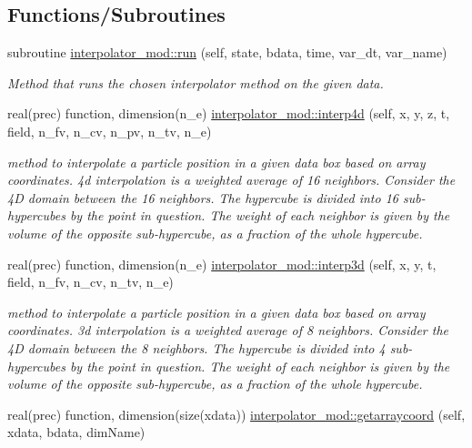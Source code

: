 \subsection*{Functions/\+Subroutines}
\begin{DoxyCompactItemize}
\item 
subroutine \mbox{\hyperlink{namespaceinterpolator__mod_a53b61f6bca0d966521c68cb3ca838d93}{interpolator\+\_\+mod\+::run}} (self, state, bdata, time, var\+\_\+dt, var\+\_\+name)
\begin{DoxyCompactList}\small\item\em Method that runs the chosen interpolator method on the given data. \end{DoxyCompactList}\item 
real(prec) function, dimension(n\+\_\+e) \mbox{\hyperlink{namespaceinterpolator__mod_ac54a92d43721099e8e5bc5a888d7ee73}{interpolator\+\_\+mod\+::interp4d}} (self, x, y, z, t, field, n\+\_\+fv, n\+\_\+cv, n\+\_\+pv, n\+\_\+tv, n\+\_\+e)
\begin{DoxyCompactList}\small\item\em method to interpolate a particle position in a given data box based on array coordinates. 4d interpolation is a weighted average of 16 neighbors. Consider the 4D domain between the 16 neighbors. The hypercube is divided into 16 sub-\/hypercubes by the point in question. The weight of each neighbor is given by the volume of the opposite sub-\/hypercube, as a fraction of the whole hypercube. \end{DoxyCompactList}\item 
real(prec) function, dimension(n\+\_\+e) \mbox{\hyperlink{namespaceinterpolator__mod_adcd5e67fbafc57180f69bfafa64377dc}{interpolator\+\_\+mod\+::interp3d}} (self, x, y, t, field, n\+\_\+fv, n\+\_\+cv, n\+\_\+tv, n\+\_\+e)
\begin{DoxyCompactList}\small\item\em method to interpolate a particle position in a given data box based on array coordinates. 3d interpolation is a weighted average of 8 neighbors. Consider the 4D domain between the 8 neighbors. The hypercube is divided into 4 sub-\/hypercubes by the point in question. The weight of each neighbor is given by the volume of the opposite sub-\/hypercube, as a fraction of the whole hypercube. \end{DoxyCompactList}\item 
real(prec) function, dimension(size(xdata)) \mbox{\hyperlink{namespaceinterpolator__mod_a8a01c7e0b55ffb05a24c08ab97b4a6a1}{interpolator\+\_\+mod\+::getarraycoord}} (self, xdata, bdata, dim\+Name)

\end{DoxyCompactItemize}
